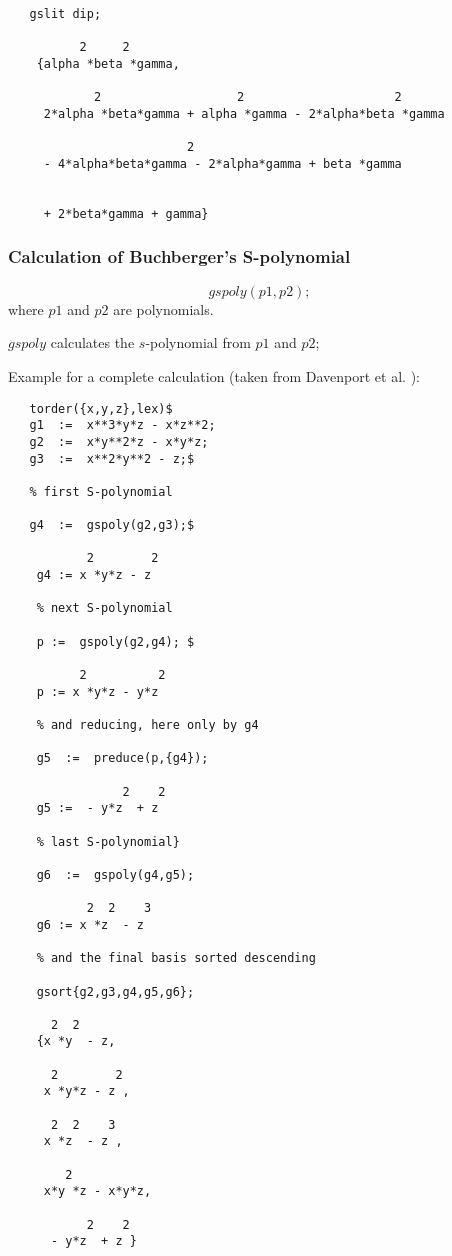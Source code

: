 \begin{verbatim}
   gslit dip;

          2     2
    {alpha *beta *gamma,

            2                   2                     2
     2*alpha *beta*gamma + alpha *gamma - 2*alpha*beta *gamma

                         2
     - 4*alpha*beta*gamma - 2*alpha*gamma + beta *gamma


     + 2*beta*gamma + gamma}

 \end{verbatim}

\subsubsection{Calculation of Buchberger's S-polynomial}
\[ gspoly (p1,p2); \]
where $p1$  and $p2$ are polynomials.

$gspoly$ calculates the $s$-polynomial from $p1$  and $p2$;

Example for a complete calculation (taken from {\sc Davenport et al.}
 \cite{Davenport:88a}):
\begin{verbatim}
   torder({x,y,z},lex)$
   g1  :=  x**3*y*z - x*z**2;
   g2  :=  x*y**2*z - x*y*z;
   g3  :=  x**2*y**2 - z;$

   % first S-polynomial

   g4  :=  gspoly(g2,g3);$

           2        2
    g4 := x *y*z - z

    % next S-polynomial

    p :=  gspoly(g2,g4); $

          2          2
    p := x *y*z - y*z

    % and reducing, here only by g4

    g5  :=  preduce(p,{g4});

                2    2
    g5 :=  - y*z  + z

    % last S-polynomial}

    g6  :=  gspoly(g4,g5);

           2  2    3
    g6 := x *z  - z

    % and the final basis sorted descending

    gsort{g2,g3,g4,g5,g6};

      2  2
    {x *y  - z,

      2        2
     x *y*z - z ,

      2  2    3
     x *z  - z ,

        2
     x*y *z - x*y*z,

           2    2
      - y*z  + z }
 \end{verbatim}

